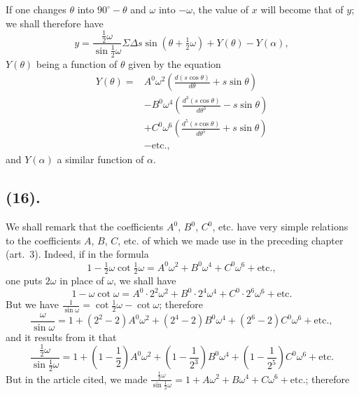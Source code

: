 \documentclass{article}
\begin{document}

If one changes $\theta$ into $90^{\circ}-\theta$ and $\omega$ into $-\omega$, the value of $x$ will become that of $y$; we shall therefore have
\[ y=\frac{\frac{1}{2}\omega}{\sin\frac{1}{2}\omega}\Sigma\Delta s\sin(\theta+\tfrac{1}{2}\omega)+Y(\theta)-Y(\alpha), \]
$Y(\theta)$ being a function of $\theta$ given by the equation
\[ \begin{aligned} Y(\theta)={}&A^{0}\omega^{2}\left(\frac{d(s\cos\theta)}{d\theta}+s\sin\theta\right)\\ &-B^{0}\omega^{4}\left(\frac{d^{3}(s\cos\theta)}{d\theta^{3}}-s\sin\theta\right)\\ &+C^{0}\omega^{6}\left(\frac{d^{5}(s\cos\theta)}{d\theta^{5}}+s\sin\theta\right)\\ &-\text{etc.}, \end{aligned} \]
and $Y(\alpha)$ a similar function of $\alpha$.

\subsection*{(16).}

We shall remark that the coefficients $A^{0}$, $B^{0}$, $C^{0}$, etc. have very simple relations to the coefficients $A$, $B$, $C$, etc. of which we made use in the preceding chapter (art.~3). Indeed, if in the formula
\[ 1-\tfrac{1}{2}\omega\cot\tfrac{1}{2}\omega=A^{0}\omega^{2}+B^{0}\omega^{4}+C^{0}\omega^{6}+\text{etc.}, \]
one puts $2\omega$ in place of $\omega$, we shall have
\[ 1-\omega\cot\omega=A^{0}\cdot2^{2}\omega^{2}+B^{0}\cdot2^{4}\omega^{4}+C^{0}\cdot2^{6}\omega^{6}+\text{etc.} \]
But we have $\frac{1}{\sin\omega}=\cot\frac{1}{2}\omega-\cot\omega$; therefore
\[ \frac{\omega}{\sin\omega}=1+(2^{2}-2)A^{0}\omega^{2}+(2^{4}-2)B^{0}\omega^{4}+(2^{6}-2)C^{0}\omega^{6}+\text{etc.}, \]
and it results from it that
\[ \frac{\frac{1}{2}\omega}{\sin\frac{1}{2}\omega}=1+\left(1-\frac{1}{2}\right)A^{0}\omega^{2}+\left(1-\frac{1}{2^{3}}\right)B^{0}\omega^{4}+\left(1-\frac{1}{2^{5}}\right)C^{0}\omega^{6}+\text{etc.} \]
But in the article cited, we made $\frac{\frac{1}{2}\omega}{\sin\frac{1}{2}\omega}=1+A\omega^{2}+B\omega^{4}+C\omega^{6}+\text{etc.}$; therefore
\end{document}
